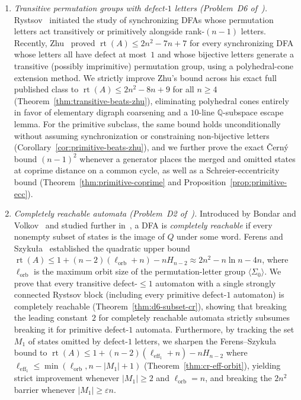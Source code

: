 \documentclass[11pt,a4paper]{article}
\theoremstyle{definition}
\theoremstyle{remark}
\newcommand{\rt}{\operatorname{rt}}
\newcommand{\leff}{\ell_{\mathrm{eff}_1}}
\newcommand{\lorb}{\ell_{\mathrm{orb}}}
\begin{document}
\begin{enumerate}[leftmargin=*,nosep]
  \item \emph{Transitive permutation groups with defect-$1$ letters (Problem~D6 of~\cite{Volkov2026}).} Rystsov~\cite{Rystsov1995} initiated the study of synchronizing DFAs whose permutation letters act transitively or primitively alongside rank-$(n-1)$ letters. Recently, Zhu~\cite{Zhu2024} proved $\rt(A) \le 2n^2 - 7n + 7$ for every synchronizing DFA whose letters all have defect at most~$1$ and whose bijective letters generate a transitive (possibly imprimitive) permutation group, using a polyhedral-cone extension method. We strictly improve Zhu's bound across his exact full published class to $\rt(A) \le 2n^2 - 8n + 9$ for all $n \ge 4$ (Theorem~\ref{thm:transitive-beats-zhu}), eliminating polyhedral cones entirely in favor of elementary digraph coarsening and a $10$-line $\mathbb{Q}$-subspace escape lemma. For the primitive subclass, the same bound holds unconditionally without assuming synchronization or constraining non-bijective letters (Corollary~\ref{cor:primitive-beats-zhu}), and we further prove the exact \v{C}ern\'y bound $(n - 1)^2$ whenever a generator places the merged and omitted states at coprime distance on a common cycle, as well as a Schreier-eccentricity bound (Theorem~\ref{thm:primitive-coprime} and Proposition~\ref{prop:primitive-ecc}).

  \item \emph{Completely reachable automata (Problem~D2 of~\cite{Volkov2026}).} Introduced by Bondar and Volkov~\cite{BV2016} and studied further in~\cite{BCV2023}, a DFA is \emph{completely reachable} if every nonempty subset of states is the image of $Q$ under some word. Ferens and Szyku\l a~\cite{FS2025} established the quadratic upper bound $\rt(A) \le 1 + (n - 2)(\lorb + n) - n H_{n - 2} \approx 2n^2 - n\ln n - 4n$, where $\lorb$ is the maximum orbit size of the permutation-letter group $\langle \Sigma_0 \rangle$. We prove that every transitive defect-$\le 1$ automaton with a single strongly connected Rystsov block (including every primitive defect-$1$ automaton) is completely reachable (Theorem~\ref{thm:d6-subset-cr}), showing that breaking the leading constant~$2$ for completely reachable automata strictly subsumes breaking it for primitive defect-$1$ automata. Furthermore, by tracking the set $M_1$ of states omitted by defect-$1$ letters, we sharpen the Ferens--Szyku\l a bound to $\rt(A) \le 1 + (n - 2)(\leff + n) - n H_{n - 2}$ where $\leff \le \min(\lorb, n - |M_1| + 1)$ (Theorem~\ref{thm:cr-eff-orbit}), yielding strict improvement whenever $|M_1| \ge 2$ and $\lorb = n$, and breaking the $2n^2$ barrier whenever $|M_1| \ge \varepsilon n$.


\end{enumerate}
\end{document}
